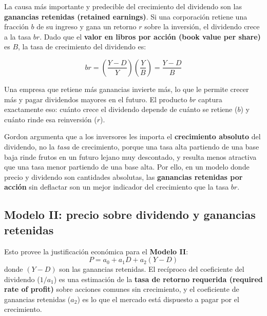 \documentclass[12pt]{article}
\begin{document}
La causa m\'as importante y predecible del crecimiento del dividendo son las \textbf{ganancias retenidas (retained earnings)}. Si una corporaci\'on retiene una fracci\'on $b$ de su ingreso y gana un retorno $r$ sobre la inversi\'on, el dividendo crece a la tasa $br$. Dado que el \textbf{valor en libros por acci\'on (book value per share)} es $B$, la tasa de crecimiento del dividendo es:

\begin{equation}
br = \left(\frac{Y-D}{Y}\right)\left(\frac{Y}{B}\right) = \frac{Y-D}{B}
\end{equation}

\begin{intuicion}
Una empresa que retiene m\'as ganancias invierte m\'as, lo que le permite crecer m\'as y pagar dividendos mayores en el futuro. El producto $br$ captura exactamente eso: cu\'anto crece el dividendo depende de cu\'anto se retiene ($b$) y cu\'anto rinde esa reinversi\'on ($r$).
\end{intuicion}

Gordon argumenta que a los inversores les importa el \textbf{crecimiento absoluto} del dividendo, no la \textit{tasa} de crecimiento, porque una tasa alta partiendo de una base baja rinde frutos en un futuro lejano muy descontado, y resulta menos atractiva que una tasa menor partiendo de una base alta. Por ello, en un modelo donde precio y dividendo son cantidades absolutas, las \textbf{ganancias retenidas por acci\'on} sin deflactar son un mejor indicador del crecimiento que la tasa $br$.

\subsection{Modelo II: precio sobre dividendo y ganancias retenidas}

Esto provee la justificaci\'on econ\'omica para el \textbf{Modelo II}:
\[
P = a_0 + a_1 D + a_2 (Y - D)
\]
donde $(Y-D)$ son las ganancias retenidas. El rec\'iproco del coeficiente del dividendo ($1/a_1$) es una estimaci\'on de la \textbf{tasa de retorno requerida (required rate of profit)} sobre acciones comunes sin crecimiento, y el coeficiente de ganancias retenidas ($a_2$) es lo que el mercado est\'a dispuesto a pagar por el crecimiento.
\end{document}
